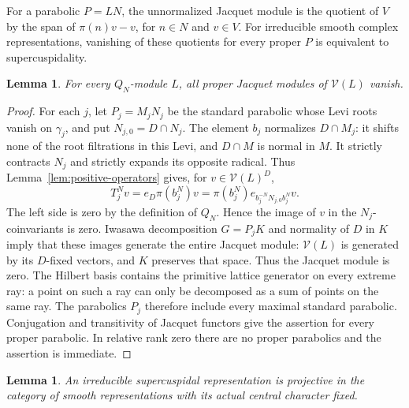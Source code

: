 \documentclass[10pt,letterpaper]{amsart}
\numberwithin{equation}{section}
\newtheorem{lemma}[theorem]{Lemma}
\theoremstyle{remark}
\begin{document}
For a parabolic $P=LN$, the unnormalized Jacquet module is the quotient
of $V$ by the span of $\pi(n)v-v$, for $n\in N$ and $v\in V$.
For irreducible smooth complex representations, vanishing of these
quotients for every proper $P$ is equivalent to supercuspidality.

\begin{lemma}\label{lem:nilpotent-hecke-cuspidality}
For every $Q_N$-module $L$, all proper Jacquet modules of $\mathcal V(L)$
vanish.
\end{lemma}

\begin{proof}
For each $j$, let $P_j=M_jN_j$ be the standard parabolic whose Levi roots
vanish on $\gamma_j$, and put $N_{j,0}=D\cap N_j$. The element $b_j$
normalizes $D\cap M_j$: it shifts none of the root filtrations in this
Levi, and $D\cap M$ is normal in $M$. It strictly contracts $N_j$ and strictly
expands its opposite radical. Thus Lemma~\ref{lem:positive-operators} gives, for $v\in\mathcal V(L)^D$,
\[
 T_j^Nv=e_D\pi(b_j^N)v
       =\pi(b_j^N)e_{b_j^{-N}N_{j,0}b_j^N}v.
\]
The left side is zero by the definition of $Q_N$. Hence the image of $v$
in the $N_j$-coinvariants is zero. Iwasawa decomposition $G=P_jK$ and
normality of $D$ in $K$ imply that these images generate the entire Jacquet
module: $\mathcal V(L)$ is generated by its $D$-fixed vectors, and $K$
preserves that space. Thus the Jacquet module is zero. The Hilbert basis
contains the primitive lattice generator on every extreme ray: a point
on such a ray can only be decomposed as a sum of points on the same ray.
The parabolics $P_j$ therefore include every maximal standard parabolic.
Conjugation and transitivity of Jacquet functors give the assertion for
every proper parabolic. In relative rank zero there are no proper
parabolics and the assertion is immediate.
\end{proof}

\begin{lemma}\label{lem:projectivity}
An irreducible supercuspidal representation is projective in the category
of smooth representations with its actual central character fixed.
\end{lemma}
\end{document}
